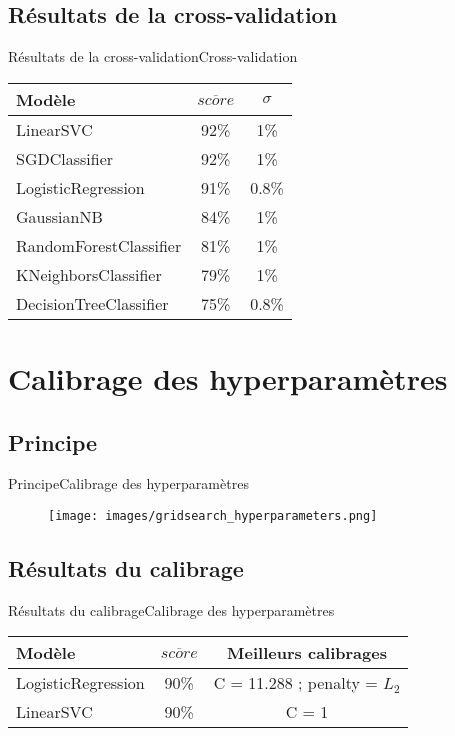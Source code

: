 \documentclass[usenames,dvipsnames]{beamer}
\newcommand*\mean[1]{\overline{#1}}
\begin{document}
\subsection{Résultats de la cross-validation}
\begin{frame}{Résultats de la cross-validation}{Cross-validation}
\begin{table}
  \centering
  \begin{tabular}{|l|c|c|}
    \hline
    \textbf{Modèle} & $\mean{score}$ & $\sigma$\\
    \hline
    \hline
    LinearSVC & 92\% & 1\%\\
    \hline
    SGDClassifier & 92\% & 1\%\\
    \hline
    LogisticRegression & 91\% & 0.8\%\\
    \hline
    GaussianNB & 84\% & 1\%\\
    \hline
    RandomForestClassifier & 81\% & 1\%\\
    \hline
    KNeighborsClassifier & 79\% & 1\%\\
    \hline
    DecisionTreeClassifier & 75\% & 0.8\%\\
    \hline
  \end{tabular}
\end{table}
\end{frame}

\section{Calibrage des hyperparamètres}
\subsection{Principe}
\begin{frame}{Principe}{Calibrage des hyperparamètres}
\begin{figure}[!ht]
  \centering
  \texttt{[image: images/gridsearch\_hyperparameters.png]}
\end{figure}
\end{frame}

\subsection{Résultats du calibrage}
\begin{frame}{Résultats du calibrage}{Calibrage des hyperparamètres}
\begin{table}
  \centering
  \begin{tabular}{|l|c|c|}
    \hline
    \textbf{Modèle} & $\mean{score}$ & \textbf{Meilleurs calibrages}\\
    \hline
    \hline
    LogisticRegression & 90\% & C = 11.288 ; penalty = $L_2$\\
    \hline
    LinearSVC & 90\% & C = 1\\
    \hline
  \end{tabular}
\end{table}
\end{frame}
\end{document}
